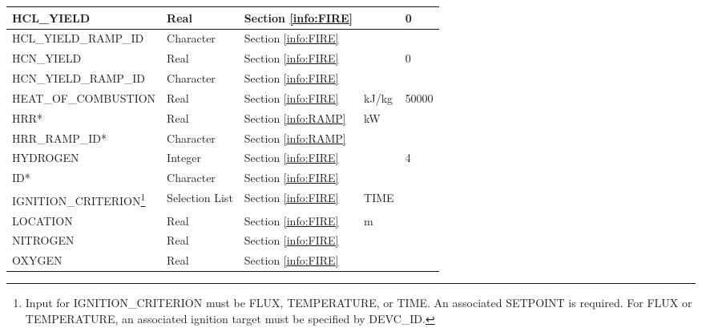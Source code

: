 \begin{minipage}{6.5in}
\begin{longtable}{@{\extracolsep{\fill}}|l|l|l|l|l|}
{\ct HCL\_YIELD}           & Real   & Section \ref{info:FIRE}                 &                             &  0               \\ \hline
{\ct HCL\_YIELD\_RAMP\_ID}            & Character        & Section \ref{info:FIRE}                 &                             &                 \\ \hline
{\ct HCN\_YIELD}           & Real   & Section \ref{info:FIRE}                 &                             &  0               \\ \hline
{\ct HCN\_YIELD\_RAMP\_ID}            & Character        & Section \ref{info:FIRE}                 &                             &                 \\ \hline
{\ct HEAT\_OF\_COMBUSTION} & Real        & Section \ref{info:FIRE}                 & kJ/kg                       &     50000       \\ \hline
{\ct HRR}*        & Real   &  Section \ref{info:RAMP}                &  kW                           &                 \\ \hline
{\ct HRR\_RAMP\_ID}*        & Character   &  Section \ref{info:RAMP}                &                             &                 \\ \hline
{\ct HYDROGEN}             & Integer     & Section \ref{info:FIRE}                 &                             &  4               \\ \hline
{\ct ID}*                   & Character   & Section \ref{info:FIRE}                 &                             &                 \\ \hline
{\ct IGNITION\_CRITERION}\footnote{Input for {\ct IGNITION\_CRITERION} must be {\ct FLUX}, {\ct TEMPERATURE}, or {\ct TIME}. An associated {\ct SETPOINT} is required. For {\ct FLUX} or {\ct TEMPERATURE}, an associated ignition target must be specified by {\ct DEVC\_ID}.}
                           & Selection List   & Section \ref{info:FIRE}                 &  TIME                           &                 \\ \hline
{\ct LOCATION}             & Real        & Section \ref{info:FIRE}                 & m                           &                 \\ \hline
{\ct NITROGEN}             & Real     & Section \ref{info:FIRE}                 &                             &                 \\ \hline
{\ct OXYGEN}               & Real     & Section \ref{info:FIRE}                 &                             &                 \\ \hline

\end{longtable}
\end{minipage}
